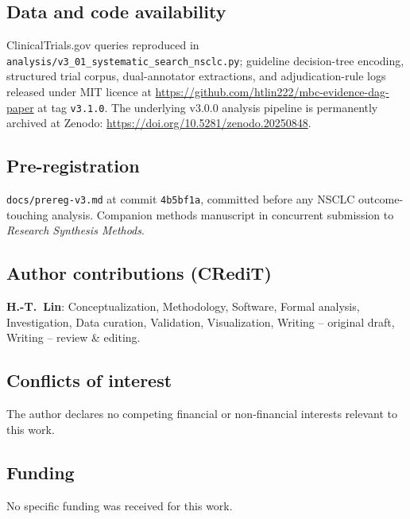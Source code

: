 \documentclass[11pt,a4paper]{article}
\begin{document}
\subsection*{Data and code availability}
ClinicalTrials.gov queries reproduced in \texttt{analysis/v3\_01\_systematic\_search\_nsclc.py}; guideline decision-tree encoding, structured trial corpus, dual-annotator extractions, and adjudication-rule logs released under MIT licence at \url{https://github.com/htlin222/mbc-evidence-dag-paper} at tag \texttt{v3.1.0}. The underlying v3.0.0 analysis pipeline is permanently archived at Zenodo: \url{https://doi.org/10.5281/zenodo.20250848}.

\subsection*{Pre-registration}
\texttt{docs/prereg-v3.md} at commit \texttt{4b5bf1a}, committed before any NSCLC outcome-touching analysis. Companion methods manuscript in concurrent submission to \textit{Research Synthesis Methods}.

\subsection*{Author contributions (CRediT)}
\textbf{H.-T.\ Lin}: Conceptualization, Methodology, Software, Formal analysis, Investigation, Data curation, Validation, Visualization, Writing -- original draft, Writing -- review \& editing.

\subsection*{Conflicts of interest}
The author declares no competing financial or non-financial interests relevant to this work.

\subsection*{Funding}
No specific funding was received for this work.



\end{document}
